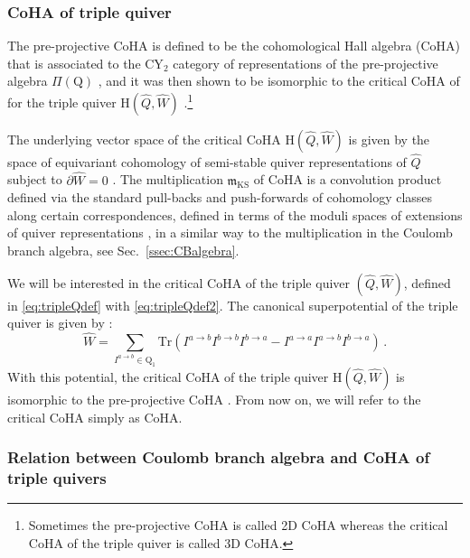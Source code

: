 \documentclass[12pt,a4paper]{article}
\renewcommand{\(}{\left(}
\renewcommand{\)}{\right)}
\renewcommand{\(}{\left(}
\renewcommand{\)}{\right)}
\begin{document}
\subsubsection{CoHA of triple quiver}


The pre-projective CoHA is defined to be the cohomological Hall algebra 
(CoHA) that is associated to the CY$_2$ category of representations of the pre-projective algebra $\Pi(\mathrm{Q})$ \cite{Yang_2014}, and it was then shown to be isomorphic to the critical CoHA of \cite{Kontsevich:2010px} for the triple quiver H$(\widehat{Q},\widehat{W})$ \cite{Yang_2016}.\footnote{Sometimes the pre-projective CoHA is called 2D CoHA whereas the critical CoHA of the triple quiver is called 3D CoHA.}

\medskip

The underlying vector space of the critical CoHA H$(\widehat{Q},\widehat{W})$ is given by the space of equivariant cohomology of semi-stable quiver representations of $\widehat{Q}$ subject to $\partial \widehat{W}=0$ \cite{Kontsevich:2010px}. 
The multiplication $\mathfrak{m}_{\textrm{KS}}$ of CoHA is a convolution product defined via the standard pull-backs and push-forwards of cohomology classes along certain correspondences, defined in terms of the moduli spaces of extensions of quiver representations \cite{Kontsevich:2010px}, in a similar way to the multiplication in the Coulomb branch algebra, see Sec.~\ref{ssec:CBalgebra}. 

We will be interested in the critical CoHA of the triple quiver $(\widehat{Q},\widehat{W})$,  defined in \eqref{eq:tripleQdef} with \eqref{eq:tripleQdef2}.
The canonical superpotential of the triple quiver is given by \cite{Ginzburg:2006fu}:
\begin{equation}\label{eq:triple_canonical_potential}
\widehat{W}=\sum_{I^{a\to b}\in\mathrm{Q}_1} \text{Tr}(I^{a\to b}I^{b\to b}I^{b\to a}-I^{a\to a}I^{a\to b}I^{b\to a})\,.
\end{equation}
With this potential, the critical CoHA of the triple quiver  H$(\widehat{Q},\widehat{W})$ is isomorphic to the  pre-projective  CoHA \cite{Yang_2016}.
From now on, we will refer to the critical CoHA simply as CoHA.

\subsubsection{Relation between Coulomb branch algebra and CoHA of triple quivers}
\end{document}
